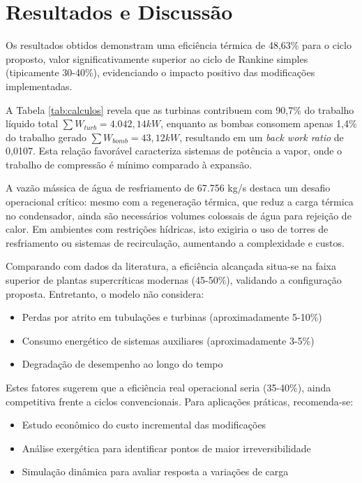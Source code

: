 \documentclass[
	article,			%
	11pt,				%
	oneside,			%
	a4paper,			%
	english,			%
	brazil,				%
	sumario=tradicional
	]{abntex2}
\begin{document}
\section{Resultados e Discussão}

Os resultados obtidos demonstram uma eficiência térmica de 48,63\% para o ciclo proposto, valor significativamente superior ao ciclo de Rankine simples (tipicamente 30-40\%), evidenciando o impacto positivo das modificações implementadas.

A Tabela \ref{tab:calculos} revela que as turbinas contribuem com 90,7\% do trabalho líquido total $\sum{W_{turb}} = 4.042,14 kW$, enquanto as bombas consomem apenas 1,4\% do trabalho gerado $\sum{W_{bomb}} = 43,12 kW$, resultando em um \textit{back work ratio} de 0,0107. Esta relação favorável caracteriza sistemas de potência a vapor, onde o trabalho de compressão é mínimo comparado à expansão.

A vazão mássica de água de resfriamento de 67.756 kg/s destaca um desafio operacional crítico: mesmo com a regeneração térmica, que reduz a carga térmica no condensador, ainda são necessários volumes colossais de água para rejeição de calor. Em ambientes com restrições hídricas, isto exigiria o uso de torres de resfriamento ou sistemas de recirculação, aumentando a complexidade e custos.

Comparando com dados da literatura, a eficiência alcançada situa-se na faixa superior de plantas supercríticas modernas (45-50\%), validando a configuração proposta. Entretanto, o modelo não considera:

\begin{itemize}
	\item Perdas por atrito em tubulações e turbinas (aproximadamente 5-10\%)
	\item Consumo energético de sistemas auxiliares (aproximadamente 3-5\%)
	\item Degradação de desempenho ao longo do tempo
\end{itemize}

Estes fatores sugerem que a eficiência real operacional seria (35-40\%), ainda competitiva frente a ciclos convencionais. Para aplicações práticas, recomenda-se:
\begin{itemize}
	\item Estudo econômico do custo incremental das modificações
	\item Análise exergética para identificar pontos de maior irreversibilidade
	\item Simulação dinâmica para avaliar resposta a variações de carga
\end{itemize}
\end{document}
